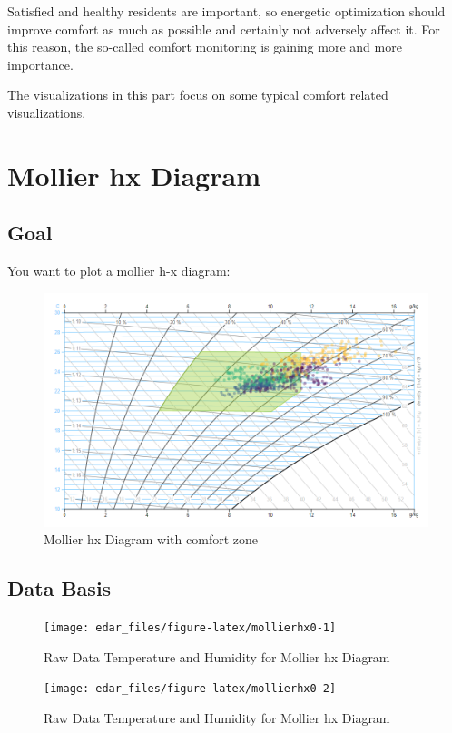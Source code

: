 \documentclass[
  a4paperpaper,
]{book}
\begin{document}
Satisfied and healthy residents are important, so energetic optimization should improve comfort as much as possible and certainly not adversely affect it. For this reason, the so-called comfort monitoring is gaining more and more importance.

The visualizations in this part focus on some typical comfort related visualizations.

\newpage

\hypertarget{mollier-hx-diagram}{%
\section{Mollier hx Diagram}\label{mollier-hx-diagram}}

\hypertarget{goal-18}{%
\subsection{Goal}\label{goal-18}}

You want to plot a mollier h-x diagram:

\begin{figure}
\includegraphics[width=0.7\linewidth]{images/comfortMollierHx} \caption{Mollier hx Diagram with comfort zone}\label{fig:unnamed-chunk-28}
\end{figure}

\hypertarget{data-basis-18}{%
\subsection{Data Basis}\label{data-basis-18}}

\begin{figure}
\texttt{[image: edar\_files/figure-latex/mollierhx0-1]} \caption{Raw Data Temperature and Humidity for Mollier hx Diagram}\label{fig:mollierhx0-1}
\end{figure}
\begin{figure}
\texttt{[image: edar\_files/figure-latex/mollierhx0-2]} \caption{Raw Data Temperature and Humidity for Mollier hx Diagram}\label{fig:mollierhx0-2}
\end{figure}
\end{document}
